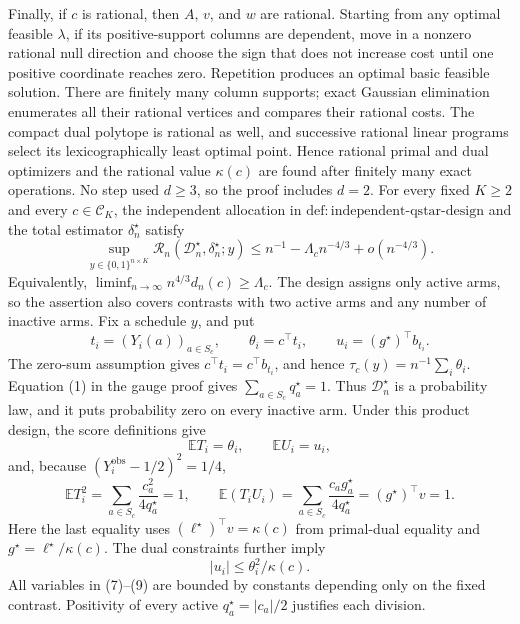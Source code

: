 Finally, if \(c\) is rational, then \(A\), \(v\), and \(w\) are rational.  Starting from any optimal feasible \(\lambda\), if its positive-support columns are dependent, move in a nonzero rational null direction and choose the sign that does not increase cost until one positive coordinate reaches zero.  Repetition produces an optimal basic feasible solution.  There are finitely many column supports; exact Gaussian elimination enumerates all their rational vertices and compares their rational costs.  The compact dual polytope is rational as well, and successive rational linear programs select its lexicographically least optimal point.  Hence rational primal and dual optimizers and the rational value \(\kappa(c)\) are found after finitely many exact operations.  No step used \(d\ge3\), so the proof includes \(d=2\).
For every fixed \(K\ge2\) and every \(c\in\mathcal C_K\), the independent allocation in \(\mathrm{def:independent\text{-}qstar\text{-}design}\) and the total estimator \(\delta_n^\star\) satisfy
\[
\sup_{y\in\{0,1\}^{n\times K}}\mathcal R_n(\mathcal D_n^\star,\delta_n^\star;y)
\le n^{-1}-\Lambda_cn^{-4/3}+o(n^{-4/3}).
\]
Equivalently, \(\liminf_{n\to\infty}n^{4/3}d_n(c)\ge\Lambda_c\).  The design assigns only active arms, so the assertion also covers contrasts with two active arms and any number of inactive arms.
Fix a schedule \(y\), and put
\[
t_i=(Y_i(a))_{a\in S_c},\qquad
\theta_i=c^\top t_i,\qquad
u_i=(g^\star)^\top b_{t_i}.
\]
The zero-sum assumption gives \(c^\top t_i=c^\top b_{t_i}\), and hence \(\tau_c(y)=n^{-1}\sum_i\theta_i\).  Equation (1) in the gauge proof gives \(\sum_{a\in S_c}q_a^\star=1\).  Thus \(\mathcal D_n^\star\) is a probability law, and it puts probability zero on every inactive arm.  Under this product design, the score definitions give
\[
\mathbb ET_i=\theta_i,
\qquad
\mathbb EU_i=u_i,
\tag{7}
\]
and, because \((Y_i^{\mathrm{obs}}-1/2)^2=1/4\),
\[
\mathbb ET_i^2=\sum_{a\in S_c}\frac{c_a^2}{4q_a^\star}=1,
\qquad
\mathbb E(T_iU_i)=\sum_{a\in S_c}\frac{c_ag_a^\star}{4q_a^\star}
=(g^\star)^\top v=1.
\tag{8}
\]
Here the last equality uses \((\ell^\star)^\top v=\kappa(c)\) from primal-dual equality and \(g^\star=\ell^\star/\kappa(c)\).  The dual constraints further imply
\[
|u_i|\le\theta_i^2/\kappa(c).
\tag{9}
\]
All variables in (7)--(9) are bounded by constants depending only on the fixed contrast.  Positivity of every active \(q_a^\star=|c_a|/2\) justifies each division.

